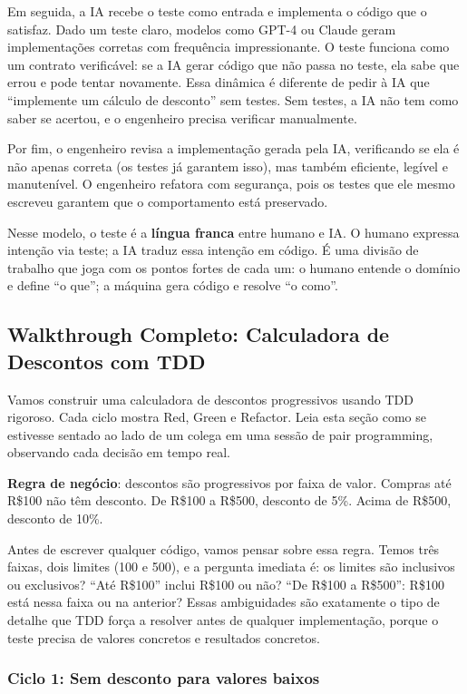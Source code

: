 Em seguida, a IA recebe o teste como entrada e implementa o código que o
satisfaz. Dado um teste claro, modelos como GPT-4 ou Claude geram implementações
corretas com frequência impressionante. O teste funciona como um contrato
verificável: se a IA gerar código que não passa no teste, ela sabe que errou e
pode tentar novamente. Essa dinâmica é diferente de pedir à IA
que ``implemente um cálculo de desconto'' sem testes. Sem testes, a IA não tem
como saber se acertou, e o engenheiro precisa verificar manualmente.

Por fim, o engenheiro revisa a implementação gerada pela IA, verificando se ela é
não apenas correta (os testes já garantem isso), mas também eficiente, legível e
manutenível. O engenheiro refatora com segurança, pois os testes que ele mesmo
escreveu garantem que o comportamento está preservado.

Nesse modelo, o teste é a \textbf{língua franca} entre humano e IA. O humano
expressa intenção via teste; a IA traduz essa intenção em código. É uma divisão
de trabalho que joga com os pontos fortes de cada um: o humano entende o domínio
e define ``o que''; a máquina gera código e resolve ``o como''.

\subsection{Walkthrough Completo: Calculadora de Descontos com TDD}

Vamos construir uma calculadora de descontos progressivos usando TDD rigoroso.
Cada ciclo mostra Red, Green e Refactor. Leia esta seção como se estivesse
sentado ao lado de um colega em uma sessão de pair programming, observando cada
decisão em tempo real.

\textbf{Regra de negócio}: descontos são progressivos por faixa de valor.
Compras até R\$100 não têm desconto. De R\$100 a R\$500, desconto de 5\%.
Acima de R\$500, desconto de 10\%.

Antes de escrever qualquer código, vamos pensar sobre essa regra. Temos três
faixas, dois limites (100 e 500), e a pergunta imediata é: os limites são
inclusivos ou exclusivos? ``Até R\$100'' inclui R\$100 ou não? ``De R\$100 a
R\$500'': R\$100 está nessa faixa ou na anterior? Essas ambiguidades são
exatamente o tipo de detalhe que TDD força a resolver antes de qualquer
implementação, porque o teste precisa de valores concretos e resultados
concretos.

\subsubsection{Ciclo 1: Sem desconto para valores baixos}


